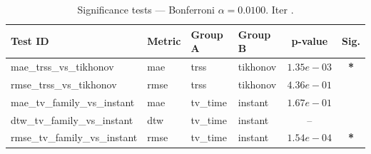 ﻿%
\begin{table}[ht]
\centering
\caption[EEG reconstruction - Iteration it15b]{Significance tests — Bonferroni $\alpha=0.0100$. Iter .}
\label{tab:sig_it15b_gaussian_3syn}
\small
\begin{tabular}{llllcc}
\toprule
Test ID & Metric & Group A & Group B & p-value & Sig. \\
\midrule
mae\_trss\_vs\_tikhonov & mae & trss & tikhonov & $1.35e-03$ & \textbf{*} \\
rmse\_trss\_vs\_tikhonov & rmse & trss & tikhonov & $4.36e-01$ &  \\
mae\_tv\_family\_vs\_instant & mae & tv\_time & instant & $1.67e-01$ &  \\
dtw\_tv\_family\_vs\_instant & dtw & tv\_time & instant & -- &  \\
rmse\_tv\_family\_vs\_instant & rmse & tv\_time & instant & $1.54e-04$ & \textbf{*} \\
\bottomrule
\end{tabular}
\end{table}







